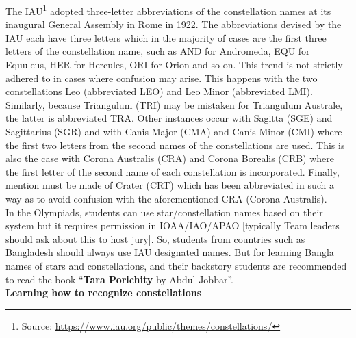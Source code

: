 \documentclass[a4paper,12pt]{extarticle}
\begin{document}
The IAU\footnote{Source: \url{https://www.iau.org/public/themes/constellations/}} adopted three-letter abbreviations of the constellation names at its inaugural General Assembly in Rome in 1922. The abbreviations devised by the IAU each have three letters which in the majority of cases are the first three letters of the constellation name, such as AND for Andromeda, EQU for Equuleus, HER for Hercules, ORI for Orion and so on. This trend is not strictly adhered to in cases where confusion may arise. This happens with the two constellations Leo (abbreviated LEO) and Leo Minor (abbreviated LMI). Similarly, because Triangulum (TRI) may be mistaken for Triangulum Australe, the latter is abbreviated TRA. Other instances occur with Sagitta (SGE) and Sagittarius (SGR) and with Canis Major (CMA) and Canis Minor (CMI) where the first two letters from the second names of the constellations are used. This is also the case with Corona Australis (CRA) and Corona Borealis (CRB) where the first letter of the second name of each constellation is incorporated. Finally, mention must be made of Crater (CRT) which has been abbreviated in such a way as to avoid confusion with the aforementioned CRA (Corona Australis).\\

In the Olympiads, students can use star/constellation names based on their system but it requires permission in IOAA/IAO/APAO [typically Team leaders should ask about this to host jury]. So, students from countries such as Bangladesh should always use IAU designated names. But for learning Bangla names of stars and constellations, and their backstory students are recommended to read the book {\color{blue}``\textbf{Tara Porichity} by Abdul Jobbar''}.\\

\textbf{Learning how to recognize constellations}
\end{document}
